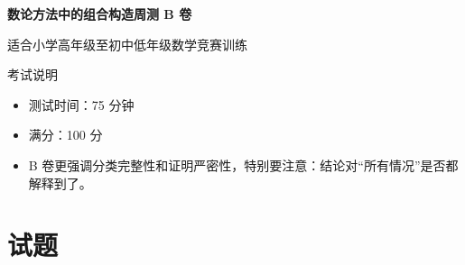 \documentclass[11pt,a4paper,fontset=fandol]{ctexart}
\begin{document}
\thispagestyle{empty}
\begin{center}
{\fontsize{22}{28}\selectfont\bfseries 数论方法中的组合构造周测 B 卷\par}
\vspace{0.4cm}
{\large 适合小学高年级至初中低年级数学竞赛训练\par}
\end{center}

\begin{infobox}{考试说明}
\begin{itemize}
  \item 测试时间：75 分钟
  \item 满分：100 分
  \item B 卷更强调分类完整性和证明严密性，特别要注意：结论对“所有情况”是否都解释到了。
\end{itemize}
\end{infobox}

\section{试题}
\end{document}

